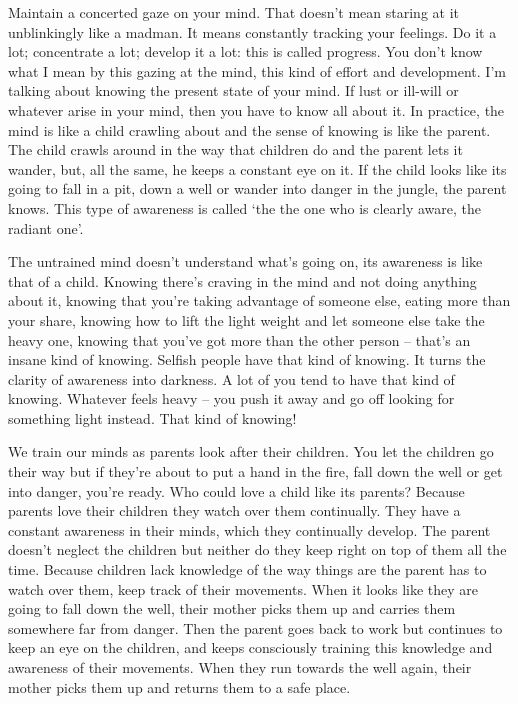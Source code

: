Maintain a concerted gaze on your mind. That doesn't mean staring at it unblinkingly like a madman. It means constantly tracking your feelings. Do it a lot; concentrate a lot; develop it a lot: this is called progress. You don't know what I mean by this gazing at the mind, this kind of effort and development. I'm talking about knowing the present state of your mind. If lust or ill-will or whatever arise in your mind, then you have to know all about it. In practice, the mind is like a child crawling about and the sense of knowing is like the parent. The child crawls around in the way that children do and the parent lets it wander, but, all the same, he keeps a constant eye on it. If the child looks like its going to fall in a pit, down a well or wander into danger in the jungle, the parent knows. This type of awareness is called `the  the one who is clearly aware, the radiant one'.

The untrained mind doesn't understand what's going on, its awareness is like that of a child. Knowing there's craving in the mind and not doing anything about it, knowing that you're taking advantage of someone else, eating more than your share, knowing how to lift the light weight and let someone else take the heavy one, knowing that you've got more than the other person -- that's an insane kind of knowing. Selfish people have that kind of knowing. It turns the clarity of awareness into darkness. A lot of you tend to have that kind of knowing. Whatever feels heavy -- you push it away and go off looking for something light instead. That kind of knowing!

We train our minds as parents look after their children. You let the children go their way but if they're about to put a hand in the fire, fall down the well or get into danger, you're ready. Who could love a child like its parents? Because parents love their children they watch over them continually. They have a constant awareness in their minds, which they continually develop. The parent doesn't neglect the children but neither do they keep right on top of them all the time. Because children lack knowledge of the way things are the parent has to watch over them, keep track of their movements. When it looks like they are going to fall down the well, their mother picks them up and carries them somewhere far from danger. Then the parent goes back to work but continues to keep an eye on the children, and keeps consciously training this knowledge and awareness of their movements. When they run towards the well again, their mother picks them up and returns them to a safe place.

